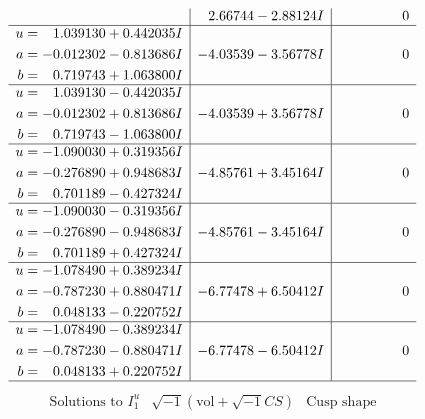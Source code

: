 \documentclass[1p]{elsarticle_modified}
\theoremstyle{definition}
\newcommand{\I}{\sqrt{-1}}
\begin{document}
$$\begin{array}{c|c|c}
 & \phantom{-}2.66744 - 2.88124 I & \phantom{-0.000000 } 0 \\ \hline\begin{aligned}
u &= \phantom{-}1.039130 + 0.442035 I \\
a &= -0.012302 - 0.813686 I \\
b &= \phantom{-}0.719743 + 1.063800 I\end{aligned}
 & -4.03539 - 3.56778 I & \phantom{-0.000000 } 0 \\ \hline\begin{aligned}
u &= \phantom{-}1.039130 - 0.442035 I \\
a &= -0.012302 + 0.813686 I \\
b &= \phantom{-}0.719743 - 1.063800 I\end{aligned}
 & -4.03539 + 3.56778 I & \phantom{-0.000000 } 0 \\ \hline\begin{aligned}
u &= -1.090030 + 0.319356 I \\
a &= -0.276890 + 0.948683 I \\
b &= \phantom{-}0.701189 - 0.427324 I\end{aligned}
 & -4.85761 + 3.45164 I & \phantom{-0.000000 } 0 \\ \hline\begin{aligned}
u &= -1.090030 - 0.319356 I \\
a &= -0.276890 - 0.948683 I \\
b &= \phantom{-}0.701189 + 0.427324 I\end{aligned}
 & -4.85761 - 3.45164 I & \phantom{-0.000000 } 0 \\ \hline\begin{aligned}
u &= -1.078490 + 0.389234 I \\
a &= -0.787230 + 0.880471 I \\
b &= \phantom{-}0.048133 - 0.220752 I\end{aligned}
 & -6.77478 + 6.50412 I & \phantom{-0.000000 } 0 \\ \hline\begin{aligned}
u &= -1.078490 - 0.389234 I \\
a &= -0.787230 - 0.880471 I \\
b &= \phantom{-}0.048133 + 0.220752 I\end{aligned}
 & -6.77478 - 6.50412 I & \phantom{-0.000000 } 0\\
 \hline 
 \end{array}$$\newpage$$\begin{array}{c|c|c}  
\text{Solutions to }I^u_{1}& \I (\text{vol} + \sqrt{-1}CS) & \text{Cusp shape}\\

\end{array}$$
\end{document}
